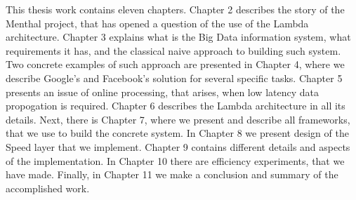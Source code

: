 This thesis work contains eleven chapters.
Chapter 2 describes the story of the Menthal project, that has opened a question of the use of the Lambda architecture.
Chapter 3 explains what is the Big Data information system, what requirements it has, and the classical naive approach to building such system. 
Two concrete examples of such approach are presented in Chapter 4, where we describe Google's and Facebook's solution for several specific tasks.
Chapter 5 presents an issue of online processing, that arises, when low latency data propogation is required.
Chapter 6 describes the Lambda architecture in all its details.
Next, there is Chapter 7, where we present and describe all frameworks, that we use to build the concrete system.
In Chapter 8 we present design of the Speed layer that we implement.
Chapter 9 contains different details and aspects of the implementation.
In Chapter 10 there are efficiency experiments, that we have made.
Finally, in Chapter 11 we make a conclusion and summary of the accomplished work.